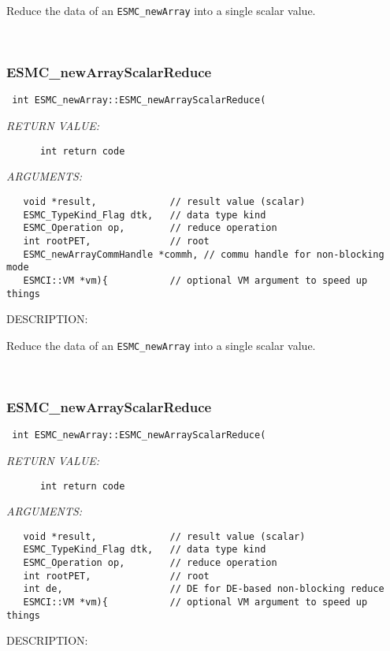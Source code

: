       Reduce the data of an {\tt ESMC\_newArray} into a single scalar value.
   
 
\mbox{}\hrulefill\
 
\subsubsection [ESMC\_newArrayScalarReduce] {ESMC\_newArrayScalarReduce}


  
\begin{verbatim} int ESMC_newArray::ESMC_newArrayScalarReduce(\end{verbatim}{\em RETURN VALUE:}
\begin{verbatim}      int return code\end{verbatim}{\em ARGUMENTS:}
\begin{verbatim}   void *result,             // result value (scalar)
   ESMC_TypeKind_Flag dtk,   // data type kind
   ESMC_Operation op,        // reduce operation
   int rootPET,              // root
   ESMC_newArrayCommHandle *commh, // commu handle for non-blocking mode
   ESMCI::VM *vm){           // optional VM argument to speed up things\end{verbatim}
{\sf DESCRIPTION:\\ }


      Reduce the data of an {\tt ESMC\_newArray} into a single scalar value.
   
 
\mbox{}\hrulefill\
 
\subsubsection [ESMC\_newArrayScalarReduce] {ESMC\_newArrayScalarReduce}


  
\begin{verbatim} int ESMC_newArray::ESMC_newArrayScalarReduce(\end{verbatim}{\em RETURN VALUE:}
\begin{verbatim}      int return code\end{verbatim}{\em ARGUMENTS:}
\begin{verbatim}   void *result,             // result value (scalar)
   ESMC_TypeKind_Flag dtk,   // data type kind
   ESMC_Operation op,        // reduce operation
   int rootPET,              // root
   int de,                   // DE for DE-based non-blocking reduce
   ESMCI::VM *vm){           // optional VM argument to speed up things\end{verbatim}
{\sf DESCRIPTION:\\ }


